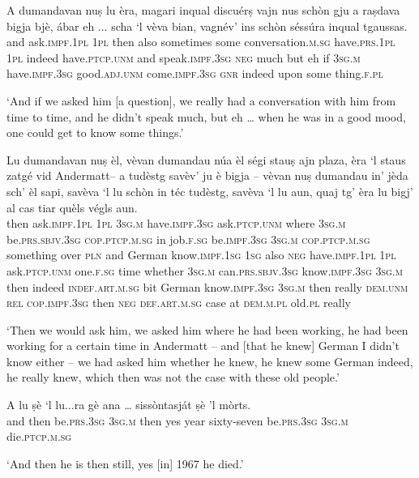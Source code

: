 \begin{linenumbers}
\gll  A dumandavan nuṣ lu èra, magari inqual discuérṣ vajn nus schòn gju a raṣdava bigja bjè, ábar eh ... scha `l vèva bian, vagnév’ ins schòn séssúra inqual tgaussas.  \\
and ask.\textsc{impf.1pl} \textsc{1pl} then also sometimes some conversation.\textsc{m.sg} have.\textsc{prs.1pl} \textsc{1pl} indeed have.\textsc{ptcp.unm} and speak.\textsc{impf.3sg} \textsc{neg} much but eh {} if \textsc{3sg.m}  have.\textsc{impf.3sg} good.\textsc{adj.unm} come.\textsc{impf.3sg} \textsc{gnr} indeed upon some thing.\textsc{f.pl} \\
\end{linenumbers}
\medskip
\glt `And if we asked him [a question], we really had a conversation with him from time to time, and he didn’t speak much, but eh … when he was in a good mood, one could get to know some things.'
\medskip

\begin{linenumbers}
\gll Lu dumandavan nuṣ èl, vèvan dumandau núa èl ségi stauṣ ajn plaza, èra `l staus zatgé vid Andermatt– a tudèstg savèv’ ju è bigja – vèvan nuṣ dumandau in' jèda sch’ èl sapi, savèva `l lu schòn in téc tudèstg, savèva `l lu aun, quaj tg’ èra lu bigj' al cas tiar quèls végls aun.   \\
then ask.\textsc{impf.1pl} \textsc{1pl} \textsc{3sg.m} have.\textsc{impf.3sg}  ask.\textsc{ptcp.unm} where \textsc{3sg.m} be.\textsc{prs.sbjv.3sg} \textsc{cop.ptcp.m.sg} in job.\textsc{f.sg} be.\textsc{impf.3sg} \textsc{3sg.m}  \textsc{cop.ptcp.m.sg} something over \textsc{pln} and German know.\textsc{impf.1sg} \textsc{1sg} also \textsc{neg} {} have.\textsc{impf.1pl} \textsc{1pl} ask.\textsc{ptcp.unm} one.\textsc{f.sg} time whether \textsc{3sg.m} can.\textsc{prs.sbjv.3sg} know.\textsc{impf.3sg} \textsc{3sg.m} then indeed \textsc{indef.art.m.sg} bit German know.\textsc{impf.3sg} \textsc{3sg.m} then really \textsc{dem.unm} \textsc{rel} \textsc{cop.impf.3sg} then \textsc{neg} \textsc{def.art.m.sg} case at \textsc{dem.m.pl} old.\textsc{pl} really \\
\end{linenumbers}
\medskip
\glt `Then we would ask him, we asked him where he had been working, he had been working for a certain time in Andermatt – and [that he knew] German I didn't know either – we had asked him whether he knew, he knew some German indeed, he really knew, which then was not the case with these old people.'
\medskip

\begin{linenumbers}
\gll  A lu ṣè `l lu...ra gè ana … sissòntasját ṣè ’l mòrts. \\
and then be.\textsc{prs.3sg} \textsc{3sg.m} then yes year {} sixty-seven be.\textsc{prs.3sg} \textsc{3sg.m} die.\textsc{ptcp.m.sg} \\
\end{linenumbers}
\medskip
\glt `And then he is then still, yes [in] 1967 he died.'
\medskip

